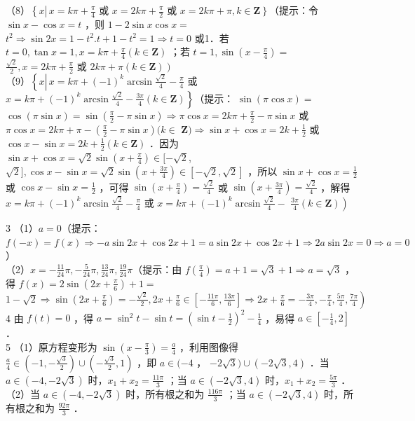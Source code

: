 \documentclass[10pt]{article}
\begin{document}
（8）\(\left\{x \left\lvert\, x=k \pi+\frac{\pi}{4}\right.\right.\) 或 \(x=2 k \pi+\frac{\pi}{2}\) 或 \(\left.x=2 k \pi+\pi, k \in \mathbf{Z}\right\}\)（提示：令 \(\sin x-\cos x=t\) ，则 \(1-2 \sin x \cos x=\) \(t^{2} \Rightarrow \sin 2 x=1-t^{2} . t+1-t^{2}=1 \Rightarrow t=0\) 或1．若 \(t=0, \tan x=1, x=k \pi+\frac{\pi}{4}(k \in \mathbf{Z})\) ；若 \(t=1, \sin \left(x-\frac{\pi}{4}\right)=\)\\
\(\frac{\sqrt{2}}{2}, x=2 k \pi+\frac{\pi}{2}\) 或 \(\left.2 k \pi+\pi(k \in \mathbf{Z})\right)\)\\
（9）\(\left\{x \left\lvert\, x=k \pi+(-1)^{k} \arcsin \frac{\sqrt{2}}{4}-\frac{\pi}{4}\right.\right.\) 或 \(\left.x=k \pi+(-1)^{k} \arcsin \frac{\sqrt{2}}{4}-\frac{3 \pi}{4}(k \in \mathbf{Z})\right\}\)（提示： \(\sin (\pi \cos x)=\) \(\cos (\pi \sin x)=\sin \left(\frac{\pi}{2}-\pi \sin x\right) \Rightarrow \pi \cos x=2 k \pi+\frac{\pi}{2}-\pi \sin x\) 或 \(\pi \cos x=2 k \pi+\pi-\left(\frac{\pi}{2}-\pi \sin x\right)(k \in\) \(\mathbf{Z}) \Rightarrow \sin x+\cos x=2 k+\frac{1}{2}\) 或 \(\cos x-\sin x=2 k+\frac{1}{2}(k \in \mathbf{Z})\) ．因为 \(\sin x+\cos x=\sqrt{2} \sin \left(x+\frac{\pi}{4}\right) \in[-\sqrt{2}\), \(\sqrt{2}], \cos x-\sin x=\sqrt{2} \sin \left(x+\frac{3 \pi}{4}\right) \in[-\sqrt{2}, \sqrt{2}]\) ，所以 \(\sin x+\cos x=\frac{1}{2}\) 或 \(\cos x-\sin x=\frac{1}{2}\) ，可得 \(\sin \left(x+\frac{\pi}{4}\right)=\frac{\sqrt{2}}{4}\) 或 \(\sin \left(x+\frac{3 \pi}{4}\right)=\frac{\sqrt{2}}{4}\) ，解得 \(x=k \pi+(-1)^{k} \arcsin \frac{\sqrt{2}}{4}-\frac{\pi}{4}\) 或 \(x=k \pi+(-1)^{k} \arcsin \frac{\sqrt{2}}{4}-\) \(\left.\frac{3 \pi}{4}(k \in \mathbf{Z})\right)\)

3 （1）\(a=0\)（提示：\(f(-x)=f(x) \Rightarrow-a \sin 2 x+\cos 2 x+1=a \sin 2 x+\cos 2 x+1 \Rightarrow 2 a \sin 2 x=0 \Rightarrow a=0\) ）\\
（2）\(x=-\frac{11}{24} \pi,-\frac{5}{24} \pi, \frac{13}{24} \pi, \frac{19}{24} \pi\)（提示：由 \(f\left(\frac{\pi}{4}\right)=a+1=\sqrt{3}+1 \Rightarrow a=\sqrt{3}\) ，得 \(f(x)=2 \sin \left(2 x+\frac{\pi}{6}\right)+1=\) \(\left.1-\sqrt{2} \Rightarrow \sin \left(2 x+\frac{\pi}{6}\right)=-\frac{\sqrt{2}}{2}, 2 x+\frac{\pi}{6} \in\left[-\frac{11 \pi}{6}, \frac{13 \pi}{6}\right] \Rightarrow 2 x+\frac{\pi}{6}=-\frac{3 \pi}{4},-\frac{\pi}{4}, \frac{5 \pi}{4}, \frac{7 \pi}{4}\right)\)\\
4 由 \(f(t)=0\) ，得 \(a=\sin ^{2} t-\sin t=\left(\sin t-\frac{1}{2}\right)^{2}-\frac{1}{4}\) ，易得 \(a \in\left[-\frac{1}{4}, 2\right]\) ．\\
5 （1）原方程变形为 \(\sin \left(x-\frac{\pi}{3}\right)=\frac{a}{4}\) ，利用图像得 \(\frac{a}{4} \in\left(-1,-\frac{\sqrt{3}}{2}\right) \cup\left(-\frac{\sqrt{3}}{2}, 1\right)\) ，即 \(a \in(-4\) ， \(-2 \sqrt{3}) \cup(-2 \sqrt{3}, 4)\) ．当 \(a \in(-4,-2 \sqrt{3})\) 时，\(x_{1}+x_{2}=\frac{11 \pi}{3}\) ；当 \(a \in(-2 \sqrt{3}, 4)\) 时，\(x_{1}+x_{2}=\frac{5 \pi}{3}\) ．\\
（2）当 \(a \in(-4,-2 \sqrt{3})\) 时，所有根之和为 \(\frac{116 \pi}{3}\) ；当 \(a \in(-2 \sqrt{3}, 4)\) 时，所有根之和为 \(\frac{92 \pi}{3}\) ．
\end{document}

